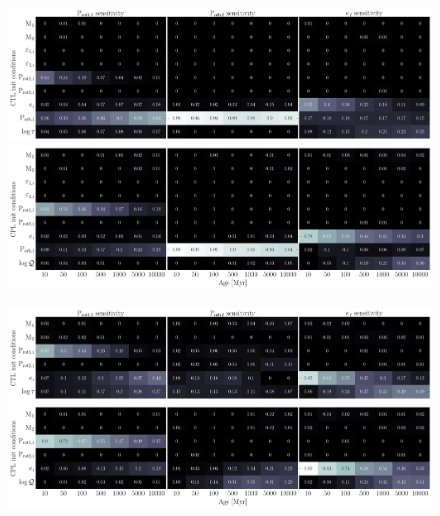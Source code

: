 \documentclass[]{aastex631}
\begin{document}
\begin{figure}[ht!]
\begin{center}
	\includegraphics[width=\linewidth]{../figures/sensitivity_ctl.png} 
	\includegraphics[width=\linewidth]{../figures/sensitivity_cpl.png}
\end{center}
\end{figure}

\begin{figure}[ht!]
\begin{center}
	\includegraphics[width=\linewidth]{../figures/sensitivity_ctl_reduced.png} 
	\includegraphics[width=\linewidth]{../figures/sensitivity_cpl_reduced.png}
\end{center}
\end{figure}
\end{document}
